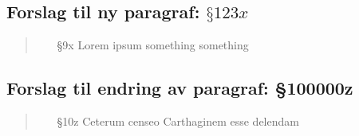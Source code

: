 \documentclass[10pt,norsk,a4paper]{article}
\begin{document}
\subsection{Forslag til ny paragraf: $§123x$}
\begin{quote}
	\begin{enumerate}
		\item[§9x] Lorem ipsum something something
	\end{enumerate}
\end{quote}

\subsection{Forslag til endring av paragraf: §100000z}
\begin{quote}
	\begin{enumerate}
		\item[§10z] Ceterum censeo Carthaginem esse delendam
	\end{enumerate}
\end{quote}\label{lastpage}


\newpage


\end{document}
